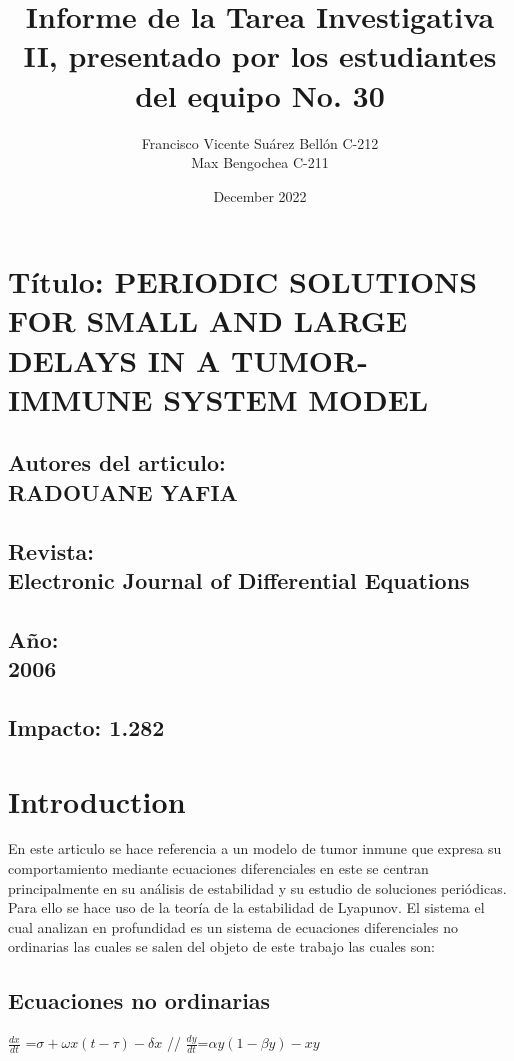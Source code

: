 \documentclass{article}
\title{Informe de la Tarea Investigativa II, presentado por los
estudiantes del equipo No. 30}
\author{Francisco Vicente Suárez Bellón C-212 \\
  Max Bengochea C-211}
\date{December 2022}
\begin{document}
\maketitle
\section*{Título: PERIODIC SOLUTIONS FOR SMALL AND LARGE DELAYS IN
A TUMOR-IMMUNE SYSTEM MODEL}
\subsection*{\centering Autores del articulo:\\
                 RADOUANE YAFIA
             }
\subsection*{\centering Revista: \\ 
                Electronic Journal of Differential Equations
             }
\subsection*{\centering Año: \\ 
                2006
             }
\subsection*{\centering Impacto: 1.282 }

\section{Introduction}
\noindent En este articulo se hace referencia a un modelo de tumor inmune que expresa su comportamiento mediante 
 ecuaciones diferenciales en este se centran principalmente en su análisis de estabilidad y su estudio de
    soluciones periódicas. Para ello se hace uso de la teoría de la estabilidad de Lyapunov. El sistema el cual analizan en 
    profundidad es un sistema de ecuaciones diferenciales no ordinarias las cuales se 
    salen del objeto de este trabajo las cuales son:
    \centering
    \subsection*{Ecuaciones no ordinarias}
        $\frac{d x}{d t} $ =$\sigma + \omega x(t- \tau )-
        \delta x
        $
        //
        $\frac{d y}{d t}$=$\alpha y(1-\beta y)-xy$
    
\end{document}
